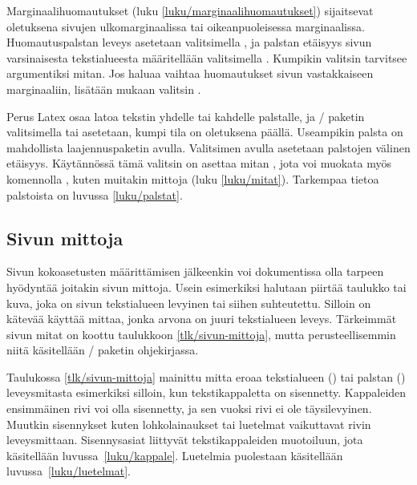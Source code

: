 Marginaalihuomautukset (luku \ref{luku/marginaalihuomautukset})
sijaitsevat oletuksena sivujen ulkomarginaalissa tai oikeanpuoleisessa
marginaalissa. Huomautuspalstan leveys asetetaan valitsimella
, ja palstan etäisyys sivun varsinaisesta
tekstialueesta määritellään valitsimella . Kumpikin
valitsin tarvitsee argumentiksi mitan. Jos haluaa vaihtaa huomautukset
sivun vastakkaiseen marginaaliin, lisätään mukaan valitsin
.

Perus Latex osaa latoa tekstin yhdelle tai kahdelle palstalle, ja
\-/ paketin valitsimella  tai
 asetetaan, kumpi tila on oletuksena päällä.
Useampikin palsta on mahdollista laajennuspaketin avulla. Valitsimen
 avulla asetetaan palstojen välinen etäisyys.
Käytännössä tämä valitsin on asettaa mitan , jota voi
muokata myös komennolla , kuten muitakin mittoja
(luku \ref{luku/mitat}). Tarkempaa tietoa palstoista on luvussa
\ref{luku/palstat}.

\subsection{Sivun mittoja}


Sivun kokoasetusten määrittämisen jälkeenkin voi dokumentissa olla
tarpeen hyödyntää joitakin sivun mittoja. Usein esimerkiksi halutaan
piirtää taulukko tai kuva, joka on sivun tekstialueen levyinen tai
siihen suhteutettu. Silloin on kätevää käyttää mittaa, jonka arvona on
juuri tekstialueen leveys. Tärkeimmät sivun mitat on koottu taulukkoon
\ref{tlk/sivun-mittoja}, mutta perusteellisemmin niitä käsitellään
\-/ paketin ohjekirjassa.

Taulukossa \ref{tlk/sivun-mittoja} mainittu mitta 
eroaa tekstialueen () tai palstan ()
leveysmitasta esimerkiksi silloin, kun tekstikappaletta on sisennetty.
Kappaleiden ensimmäinen rivi voi olla sisennetty, ja sen vuoksi rivi ei
ole täysilevyinen. Muutkin sisennykset kuten lohkolainaukset tai
luetelmat vaikuttavat rivin leveysmittaan. Sisennysasiat liittyvät
tekstikappaleiden muotoiluun, jota käsitellään
luvussa~\ref{luku/kappale}. Luetelmia puolestaan käsitellään
luvussa~\ref{luku/luetelmat}.

